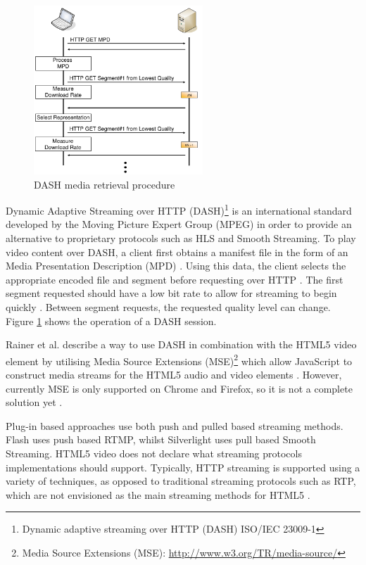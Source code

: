 \documentclass[journal]{IEEEtran}
\begin{document}
\begin{figure}[!t]
\centering
\includegraphics[width=2.5in]{dash-procedure}
\caption{DASH media retrieval procedure \cite{inproceedings:dynamicAdapativeHTTPStreamingLive}}
\label{fig:dashProcedure}
\end{figure} 

Dynamic Adaptive Streaming over HTTP (DASH)\footnote{Dynamic
adaptive streaming over HTTP (DASH) ISO/IEC 23009-1} is an international standard developed by the Moving Picture Expert Group (MPEG) in order to provide an alternative to proprietary protocols such as HLS and Smooth Streaming. To play video content over DASH, a client first obtains a manifest file in the form of an Media Presentation Description (MPD) \cite{article:MPEGDASH}. Using this data, the client selects the appropriate encoded file and segment before requesting over HTTP \cite{article:MPEGDASH}. The first segment requested should have a low bit rate to allow for streaming to begin quickly \cite{inproceedings:dynamicAdapativeHTTPStreamingLive}. Between segment requests, the requested quality level can change. Figure \ref{fig:dashProcedure} shows the operation of a DASH session.

Rainer et al. describe a way to use DASH in combination with the HTML5 video element by utilising Media Source Extensions (MSE)\footnote{Media Source Extensions (MSE): \url{http://www.w3.org/TR/media-source/}} which allow JavaScript to construct media streams for the HTML5 audio and video elements \cite{standard:mse} \cite{inproceedings:aSeamlessIntegrationOfAdaptiveHTTPStreaming}. However, currently MSE is only supported on Chrome and Firefox, so it is not a complete solution yet \cite{website:mdnMediaSource}.

Plug-in based approaches use both push and pulled based streaming methods. Flash uses push based RTMP, whilst Silverlight uses pull based Smooth Streaming. HTML5 video does not declare what streaming protocols implementations should support. Typically, HTTP streaming is supported using a variety of techniques, as opposed to traditional streaming protocols such as RTP, which are not envisioned as the main streaming methods for HTML5 \cite{article:towardsVideoOnTheWebWithHTML5}.
\end{document}
